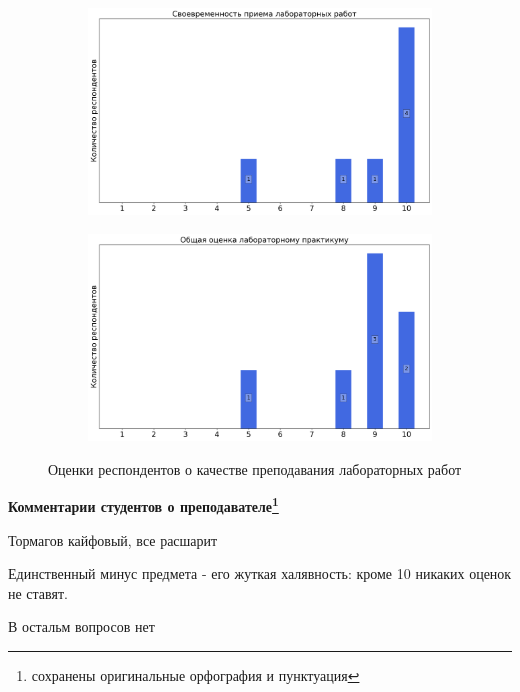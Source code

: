 \begin{figure}[H]
\begin{subfigure}[b]{0.45\textwidth}
				\includegraphics[width=\textwidth]{images/3 course/Радиофизическая лаборатория/labniks-marks-Тормагов Т.А.-2.png}
			\end{subfigure}
			\begin{subfigure}[b]{0.45\textwidth}
				\centering
				\includegraphics[width=\textwidth]{images/3 course/Радиофизическая лаборатория/labniks-marks-Тормагов Т.А.-3.png}
			\end{subfigure}	
			\caption{Оценки респондентов о качестве преподавания лабораторных работ}
		\end{figure}

		\textbf{Комментарии студентов о преподавателе\protect\footnote{сохранены оригинальные орфография и пунктуация}}
            \begin{commentbox} 
                Тормагов кайфовый, все расшарит 
            \end{commentbox} 

            \begin{commentbox} 
                Единственный минус предмета - его жуткая халявность: кроме 10 никаких оценок не ставят.

                В остальм вопросов нет 
            \end{commentbox} 

